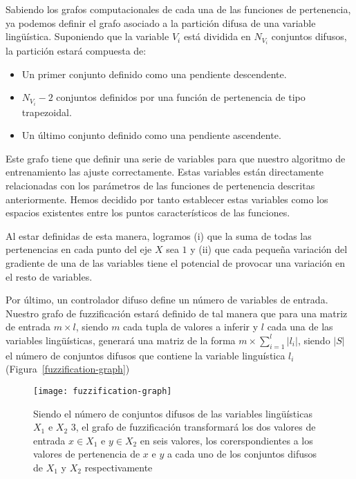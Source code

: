 Sabiendo los grafos computacionales de cada una de las funciones de pertenencia, ya podemos definir el grafo asociado a la partición difusa de una variable lingüística. Suponiendo que la variable $V_i$ está dividida en $N_{V_i}$ conjuntos difusos, la partición estará compuesta de:

\begin{itemize}
	\item Un primer conjunto definido como una pendiente descendente.
	\item $N_{V_i} - 2$ conjuntos definidos por una función de pertenencia de tipo trapezoidal.
	\item Un último conjunto definido como una pendiente ascendente.
\end{itemize}

Este grafo tiene que definir una serie de variables para que nuestro algoritmo de entrenamiento las ajuste correctamente. Estas variables están directamente relacionadas con los parámetros de las funciones de pertenencia descritas anteriormente. Hemos decidido por tanto establecer estas variables como los espacios existentes entre los puntos característicos de las funciones.

Al estar definidas de esta manera, logramos (i) que la suma de todas las pertenencias en cada punto del eje $X$ sea $1$ y (ii) que cada pequeña variación del gradiente de una de las variables tiene el potencial de provocar una variación en el resto de variables.

Por último, un controlador difuso define un número de variables de entrada. Nuestro grafo de fuzzificación estará definido de tal manera que para una matriz de entrada $m \times l$, siendo $m$ cada tupla de valores a inferir y $l$ cada una de las variables lingüísticas, generará una matriz de la forma $m \times \sum_{i=1}^l \left\vert{l_i}\right\vert$, siendo $\left\vert{S}\right\vert$ el número de conjuntos difusos que contiene la variable linguística $l_i$ (Figura~\ref{fuzzification-graph})

\begin{figure}
	\centering
	\texttt{[image: fuzzification-graph]}
	\caption[Ejemplo de operación de fuzzificación como grafo computacional]{Siendo el número de conjuntos difusos de las variables lingüísticas $X_1$ e $X_2$ $3$, el grafo de fuzzificación transformará los dos valores de entrada $x \in X_1$ e $y \in X_2$ en seis valores, los corerspondientes a los valores de pertenencia de $x$ e $y$ a cada uno de los conjuntos difusos de $X_1$ y $X_2$ respectivamente}
	\label{fig:fuzzification-graph}
\end{figure}

